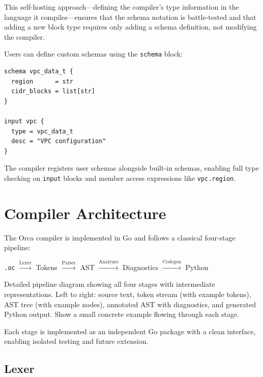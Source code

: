 \documentclass[sigconf,nonacm]{acmart}
\begin{document}
This self-hosting approach---defining the compiler's type information in
the language it compiles---ensures that the schema notation is
battle-tested and that adding a new block type requires only adding a
schema definition, not modifying the compiler.

Users can define custom schemas using the \texttt{schema} block:

\begin{lstlisting}
schema vpc_data_t {
  region      = str
  cidr_blocks = list[str]
}

input vpc {
  type = vpc_data_t
  desc = "VPC configuration"
}
\end{lstlisting}

The compiler registers user schemas alongside built-in schemas, enabling
full type checking on \texttt{input} blocks and member access expressions
like \texttt{vpc.region}.

\section{Compiler Architecture}
\label{sec:compiler}

The Orca compiler is implemented in Go and follows a classical four-stage
pipeline:

\begin{center}
\texttt{.oc} $\xrightarrow{\text{Lexer}}$ Tokens
$\xrightarrow{\text{Parser}}$ AST
$\xrightarrow{\text{Analyzer}}$ Diagnostics
$\xrightarrow{\text{Codegen}}$ Python
\end{center}

\begin{imgplaceholder}
Detailed pipeline diagram showing all four stages with intermediate
representations. Left to right: source text, token stream (with example
tokens), AST tree (with example nodes), annotated AST with diagnostics,
and generated Python output. Show a small concrete example flowing through
each stage.
\end{imgplaceholder}

Each stage is implemented as an independent Go package with a clean
interface, enabling isolated testing and future extension.

\subsection{Lexer}
\label{sec:compiler:lexer}
\end{document}
